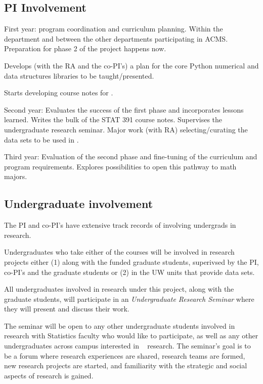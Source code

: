 \subsection{PI Involvement}

\bits
\item First year: program coordination and curriculum planning. Within the department and between the other departments participating in ACMS. Preparation for phase 2 of the project happens now. 

Develops (with the RA and the co-PI's) a plan for the core Python numerical and data structures libraries to be taught/presented. 

Starts developing course notes for \statcl.

\item Second year: Evaluates the success of the first phase and
  incorporates lessons learned. Writes the bulk of the STAT 391 course
  notes. Supervises the undergraduate research seminar. Major work
  (with RA) selecting/curating the data sets to be used in
  \statcl. 

\item Third year: Evaluation of the second phase and fine-tuning of
  the curriculum and program requirements. Explores possibilities to
  open this pathway to math majors.
 \eits

\subsection{Undergraduate involvement}

The PI and co-PI's have extensive track records of involving
undergrads in research. 

Undergraduates who take either of the courses will be involved in
research projects either (1) along with the funded graduate students,
superivsed by the PI, co-PI's and the graduate students or (2) in the
UW units that provide data sets.

All undergraduates involved in research under this project, along with
the graduate students, will participate in an {\em Undergraduate
\cdse  Research Seminar}  where they will present and
discuss their work.  

The seminar will be open to any other undergraduate students involved
in research with Statistics faculty who would like to participate, as
well as any other undergraduates across campus interested in \cdse~
research. The seminar's goal is to be a forum where research
experiences are shared, research teams are formed, new research
projects are started, and familiarity with the strategic and social
aspects of research is gained. 

